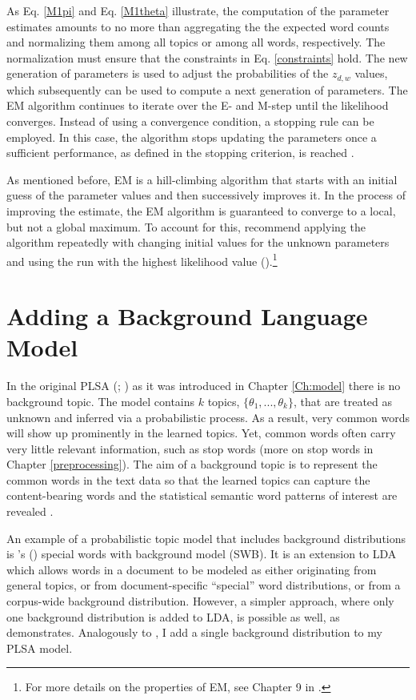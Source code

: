 \documentclass[11pt,a4paper,english,oneside]{book}
\numberwithin{equation}{chapter}
\begin{document}
As Eq. \ref{M1pi} and Eq. \ref{M1theta} illustrate, the computation of the parameter estimates amounts to no more than aggregating the the expected word counts and normalizing them among all topics or among all words, respectively. The normalization must ensure that the constraints in Eq. \ref{constraints} hold. The new generation of parameters is used to adjust the probabilities of the $z_{d,w}$ values, which subsequently can be used to compute a next generation of parameters. The EM algorithm continues to iterate over the E- and M-step until the likelihood converges. Instead of using a convergence condition, a stopping rule can be employed. In this case, the algorithm stops updating the parameters once a sufficient performance, as defined in the stopping criterion, is reached \citep[pp. 182--183]{Hofmann.2001}. 

As mentioned before, EM is a hill-climbing algorithm that starts with an initial guess of the parameter values and then successively improves it. In the process of improving the estimate, the EM algorithm is guaranteed to converge to a local, but not a global maximum. To account for this, \citeauthor{Zhai.2016} recommend applying the algorithm repeatedly with changing initial values for the unknown parameters and using the run with the highest likelihood value (\citeyear[pp. 363--368]{Zhai.2016}).\footnote{For more details on the properties of EM, see Chapter 9 in \cite{Bishop.2006}.}

\section{Adding a Background Language Model}\label{Ch:background}


In the original PLSA (\citealp{Hofmann.1999}; \citeyear{Hofmann.2001}) as it was introduced in Chapter \ref{Ch:model} there is no background topic. The model contains $k$ topics, $\{\theta_1, ..., \theta_k\}$, that are treated as unknown and inferred via a probabilistic process. As a result, very common words will show up prominently in the learned topics. Yet, common words often carry very little relevant information, such as stop words (more on stop words in Chapter \ref{preprocessing}). 
The aim of a background topic is to represent the common words in the text data so that the learned topics can capture the content-bearing words and the statistical semantic word patterns of interest are revealed \cite[pp.7--8]{Darling.2011}. 

An example of a probabilistic topic model that includes background distributions is \citeauthor{Chem.2007}'s (\citeyear{Chem.2007}) special words with background model (SWB). It is an extension to LDA which allows words in a document to be modeled as either originating from general topics, or from document-specific “special” word distributions, or from a corpus-wide background distribution. However, a simpler approach, where only one background distribution is added to LDA, is possible as well, as \citet[pp.7--8]{Darling.2011} demonstrates. Analogously to \cite{Darling.2011}, I add a single background distribution to my PLSA model.
\end{document}

